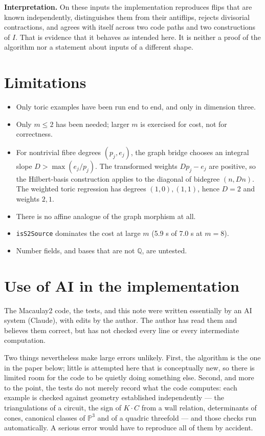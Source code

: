 \documentclass[11pt,reqno]{amsart}
\providecommand{\tightlist}{%
  \setlength{\itemsep}{0pt}\setlength{\parskip}{0pt}}
\newcommand{\PP}{\ensuremath{\mathbb{P}}}
\newcommand{\QQ}{\ensuremath{\mathbb{Q}}}
\theoremstyle{plain}
\theoremstyle{definition}
\begin{document}
\textbf{Interpretation.} On these inputs the implementation reproduces
flips that are known independently, distinguishes them from their
antiflips, rejects divisorial contractions, and agrees with itself
across two code paths and two constructions of \(I\). That is evidence
that it behaves as intended here. It is neither a proof of the algorithm
nor a statement about inputs of a different shape.

\section{Limitations}\label{limitations}

\begin{itemize}
\tightlist
\item
  Only toric examples have been run end to end, and only in dimension
  three.
\item
  Only \(m \leq 2\) has been needed; larger \(m\) is exercised for cost,
  not for correctness.
\item
  For nontrivial fibre degrees \((p_j,e_j)\), the graph bridge chooses an
  integral slope \(D>\max(e_j/p_j)\).  The transformed weights
  \(Dp_j-e_j\) are positive, so the Hilbert-basis construction applies
  to the diagonal of bidegree \((n,Dn)\).  The weighted toric regression
  has degrees \((1,0),(1,1)\), hence \(D=2\) and weights \(2,1\).
\item
  There is no affine analogue of the graph morphism at all.
\item
  \texttt{isS2Source} dominates the cost at large \(m\) (5.9 s of 7.0 s
  at \(m = 8\)).
\item
  Number fields, and bases that are not \QQ{}, are untested.
\end{itemize}

\section{Use of AI in the
implementation}\label{use-of-ai-in-the-implementation}

The Macaulay2 code, the tests, and this note were written essentially by
an AI system (Claude), with edits by the author. The author has read
them and believes them correct, but has not checked every line or every
intermediate computation.

Two things nevertheless make large errors unlikely. First, the algorithm
is the one in the paper below; little is attempted here that is
conceptually new, so there is limited room for the code to be quietly
doing something else. Second, and more to the point, the tests do not
merely record what the code computes: each example is checked against
geometry established independently --- the triangulations of a circuit,
the sign of \(K \cdot C\) from a wall relation, determinants of cones,
canonical classes of $\PP^3$ and of a quadric threefold --- and those checks
run automatically. A serious error would have to reproduce all of them
by accident.
\end{document}

